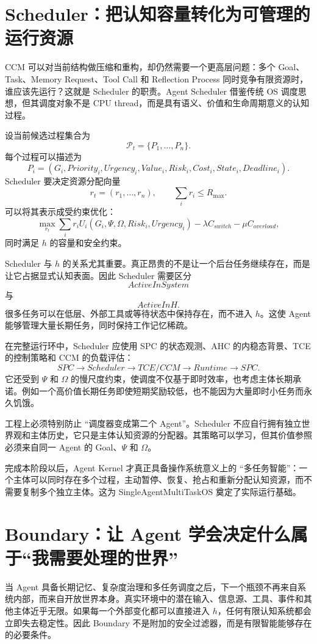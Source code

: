 \section{Scheduler：把认知容量转化为可管理的运行资源}

CCM 可以对当前结构做压缩和重构，却仍然需要一个更高层问题：多个 Goal、Task、Memory Request、Tool Call 和 Reflection Process 同时竞争有限资源时，谁应该先运行？这就是 Scheduler 的职责。Agent Scheduler 借鉴传统 OS 调度思想，但其调度对象不是 CPU thread，而是具有语义、价值和生命周期意义的认知过程。

设当前候选过程集合为
\[
\mathcal P_t
=
\{P_1,\ldots,P_n\}.
\]
每个过程可以描述为
\[
P_i
=
(
G_i,
Priority_i,
Urgency_i,
Value_i,
Risk_i,
Cost_i,
State_i,
Deadline_i
).
\]
Scheduler 要决定资源分配向量
\[
r_t
=
(r_1,\ldots,r_n),
\qquad
\sum_i r_i
\leq R_{\max}.
\]
可以将其表示成受约束优化：
\[
\max_{r_t}
\sum_i
r_i
U_i(
G_i,\Psi,\Omega,Risk_i,Urgency_i
)
-
\lambda C_{switch}
-
\mu C_{overload},
\]
同时满足 $h$ 的容量和安全约束。

Scheduler 与 $h$ 的关系尤其重要。真正昂贵的不是让一个后台任务继续存在，而是让它占据显式认知表面。因此 Scheduler 需要区分
\[
ActiveInSystem
\]
与
\[
ActiveInH.
\]
很多任务可以在低层、外部工具或等待状态中保持存在，而不进入 $h$。这使 Agent 能够管理大量长期任务，同时保持工作记忆稀疏。

在完整运行环中，Scheduler 应使用 SPC 的状态观测、AHC 的内稳态背景、TCE 的控制策略和 CCM 的负载评估：
\[
SPC
\rightarrow
Scheduler
\rightarrow
TCE/CCM
\rightarrow
Runtime
\rightarrow
SPC.
\]
它还受到 $\Psi$ 和 $\Omega$ 的慢尺度约束，使调度不仅基于即时效率，也考虑主体长期承诺。例如一个高价值长期任务即使短期奖励较低，也不能因为大量即时小任务而永久饥饿。

工程上必须特别防止 ``调度器变成第二个 Agent''。Scheduler 不应自行拥有独立世界观和主体历史，它只是主体认知资源的分配器。其策略可以学习，但其价值参照必须来自同一 Agent 的 Goal、$\Psi$ 和 $\Omega$。

完成本阶段以后，Agent Kernel 才真正具备操作系统意义上的 ``多任务智能''：一个主体可以同时存在多个过程，主动暂停、恢复、抢占和重新分配认知资源，而不需要复制多个独立主体。这为 SingleAgentMultiTaskOS 奠定了实际运行基础。

\section{Boundary：让 Agent 学会决定什么属于“我需要处理的世界”}

当 Agent 具备长期记忆、复杂度治理和多任务调度之后，下一个瓶颈不再来自系统内部，而来自开放世界本身。真实环境中的潜在输入、信息源、工具、事件和其他主体近乎无限。如果每一个外部变化都可以直接进入 $h$，任何有限认知系统都会立即失去稳定性。因此 Boundary 不是附加的安全过滤器，而是有限智能能够存在的必要条件。

